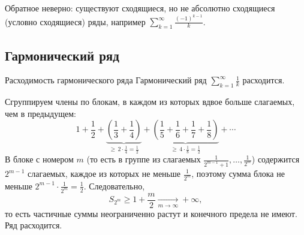 \begin{Remark}{}{}
	Обратное неверно: существуют сходящиеся, но не абсолютно сходящиеся
	(условно сходящиеся) ряды, например $\sum_{k=1}^{\infty}\frac{(-1)^{k-1}}{k}$.
\end{Remark}

\subsection*{Гармонический ряд}

\begin{Example}{Расходимость гармонического ряда}{}
	Гармонический ряд $\displaystyle\sum_{k=1}^{\infty}\frac1k$ расходится.

	Сгруппируем члены по блокам, в каждом из которых вдвое больше слагаемых,
	чем в предыдущем:
	\[
	1+\frac12+\underbrace{\left(\frac13+\frac14\right)}_{\ge\,2\cdot\frac14=\frac12}
	+\underbrace{\left(\frac15+\frac16+\frac17+\frac18\right)}_{\ge\,4\cdot\frac18=\frac12}+\cdots
	\]
	В блоке с номером $m$ (то есть в группе из слагаемых
	$\frac{1}{2^{m-1}+1},\dots,\frac{1}{2^m}$) содержится $2^{m-1}$ слагаемых,
	каждое из которых не меньше $\frac{1}{2^m}$, поэтому сумма блока не меньше
	$2^{m-1}\cdot\frac{1}{2^m}=\frac12$. Следовательно,
	\[
	S_{2^m}\ge 1+\frac{m}{2}\xrightarrow[m\to\infty]{}+\infty,
	\]
	то есть частичные суммы неограниченно растут и конечного предела не имеют.
	Ряд расходится.
\end{Example}

